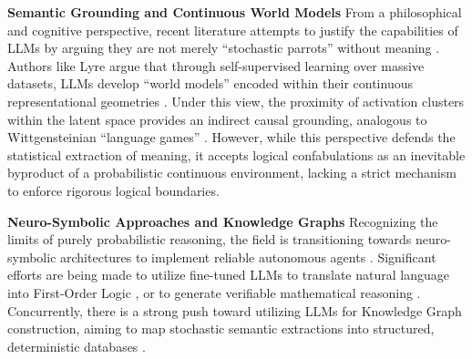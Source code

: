 \documentclass{article}
\begin{document}
\textbf{Semantic Grounding and Continuous World Models} From a
philosophical and cognitive perspective, recent literature attempts to
justify the capabilities of LLMs by arguing they are not merely
``stochastic parrots'' without meaning \citep{bender2020}. Authors like
Lyre argue that through self-supervised learning over massive datasets,
LLMs develop ``world models'' encoded within their continuous
representational geometries \citep{lyre2024understanding}. Under this
view, the proximity of activation clusters within the latent space
provides an indirect causal grounding, analogous to Wittgensteinian
``language games'' \citep{lyre2024understanding}. However, while this
perspective defends the statistical extraction of meaning, it accepts
logical confabulations as an inevitable byproduct of a probabilistic
continuous environment, lacking a strict mechanism to enforce rigorous
logical boundaries.

\textbf{Neuro-Symbolic Approaches and Knowledge Graphs} Recognizing the
limits of purely probabilistic reasoning, the field is transitioning
towards neuro-symbolic architectures to implement reliable autonomous
agents \citep{ibrahim2026, ferrone2019}. Significant efforts are being
made to utilize fine-tuned LLMs to translate natural language into
First-Order Logic \citep{vossel2025advancing, liu2025code4logic}, or to
generate verifiable mathematical reasoning \citep{symcode2025}.
Concurrently, there is a strong push toward utilizing LLMs for Knowledge
Graph construction, aiming to map stochastic semantic extractions into
structured, deterministic databases
\citep{choi2025knowledge, bian2025llm}.
\end{document}
